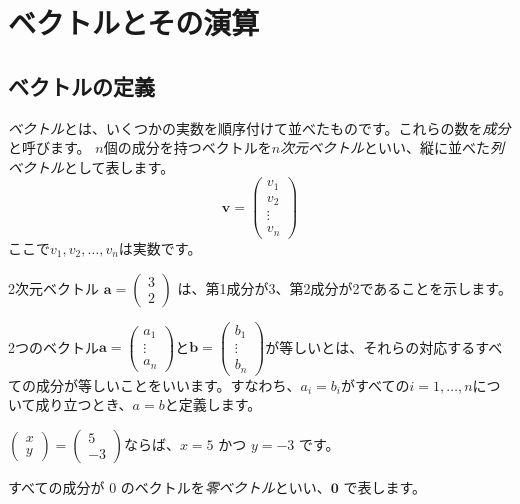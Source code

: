 \section{ベクトルとその演算}
\subsection{ベクトルの定義}

\emph{ベクトル}とは、いくつかの実数を順序付けて並べたものです。これらの数を\emph{成分}と呼びます。
$n$個の成分を持つベクトルを\emph{$n$次元ベクトル}といい、縦に並べた\emph{列ベクトル}として表します。
\[\bm{v} = \begin{pmatrix} v_1 \\ v_2 \\ \vdots \\ v_n \end{pmatrix}\]
ここで$v_1, v_2,\ldots,v_n$は実数です。
\begin{ex}
2次元ベクトル $\bm{a} = \begin{pmatrix} 3 \\ 2 \end{pmatrix}$ は、第1成分が3、第2成分が2であることを示します。
\end{ex}
\begin{dfn}[ベクトルの等しさ]
2つのベクトル$\bm{a}=\begin{pmatrix} a_1 \\ \vdots \\ a_n \end{pmatrix}$と$\bm{b}=\begin{pmatrix} b_1 \\ \vdots \\ b_n \end{pmatrix}$が等しいとは、それらの対応するすべての成分が等しいことをいいます。すなわち、$a_i=b_i$がすべての$i=1,\ldots,n$について成り立つとき、$a=b$と定義します。
\end{dfn}
\begin{ex}
$\begin{pmatrix} x \\ y \end{pmatrix} = \begin{pmatrix} 5 \\ -3 \end{pmatrix}$ならば、$x=5$ かつ $y=−3$ です。
\end{ex}
\begin{dfn}[零ベクトル]
すべての成分が $0$ のベクトルを\emph{零ベクトル}といい、$\bm{0}$ で表します。
\end{dfn}
